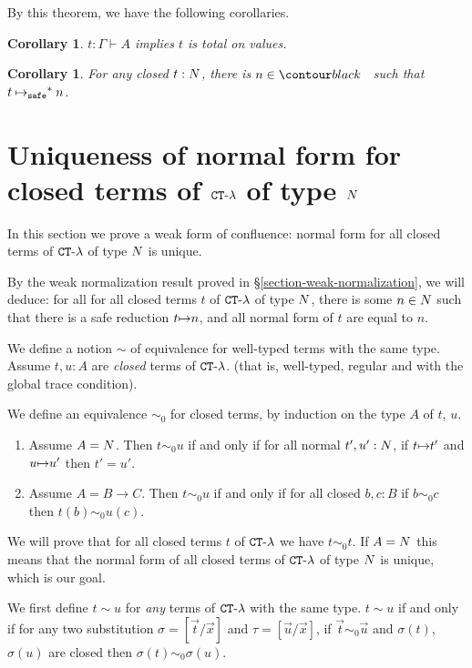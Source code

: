 \documentclass{article}
\newtheorem{corollary}[theorem]{Corollary}
\begin{document}
By this theorem, we have the following corollaries. 

\begin{corollary}
  $t: \Gamma\vdash A$ implies $t$ is total on values.
\end{corollary}

\begin{corollary}
  For any closed $t:{N}$, there is $n\in\Nat$ such that $t\mathbin{{\mapsto}_{\tiny \tt safe}}^* n$. 
\end{corollary}




\section{Uniqueness of normal form for closed terms of ${ {\tt CT} \mbox{-} \lambda}$ of type ${N}$}
In this section we prove a weak form of confluence: normal form for
all closed terms of ${ {\tt CT} \mbox{-} \lambda}$ of type ${N}$ is unique.

By the weak normalization result proved in \S  \ref{section-weak-normalization},
we will deduce: for all for all closed terms $t$ of ${ {\tt CT} \mbox{-} \lambda}$ of type ${N}$, 
there is some $n \in {N}$ such that there is a safe reduction $t {\mapsto} n$, and all normal form of $t$
are equal to $n$.

We define a notion $\sim$ of equivalence for well-typed terms with the same type.
Assume $t, u : A$ are \emph{closed} terms of ${ {\tt CT} \mbox{-} \lambda}$.
 (that is, well-typed, regular and with the global trace condition). 

We define an equivalence $\sim_0$ for closed terms,
by induction on the type $A$ of $t$, $u$.

\begin{enumerate}
\item
Assume $A = {N}$. Then $t \sim_0 u$ if and only if for all normal $t',u':{N}$, if $t {\mapsto} t'$
and $u {\mapsto} u'$ then $t'=u'$.
\item
Assume $A = B \rightarrow C$. Then $t \sim_0 u$ if and only if for all closed $b,c:B$ if
$b \sim_0 c$ then $t(b) \sim_0 u(c)$.
\end{enumerate}

We will prove that for all closed terms $t$ of ${ {\tt CT} \mbox{-} \lambda}$ we have $t \sim_0 t$.
If $A={N}$ this means that the normal form of all closed terms of ${ {\tt CT} \mbox{-} \lambda}$ of type ${N}$ is unique,
which is our goal.

We first define $t \sim u$ for \emph{any} terms of ${ {\tt CT} \mbox{-} \lambda}$ with the same type.
 $t \sim u$ if and only if for any two substitution 
$\sigma = [\vec{t} / \vec{x}]$ and $\tau = [\vec{u} / \vec{x}]$,
if $\vec{t} \sim_0 \vec{u}$ and $\sigma(t)$, $\sigma(u)$ are closed then $\sigma(t) \sim_0 \sigma(u)$.
\end{document}
